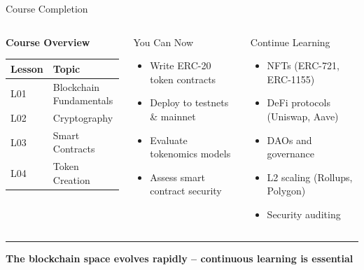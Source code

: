 \documentclass[8pt,aspectratio=169]{beamer}
\newcommand{\bottomnote}[1]{\vfill\vspace{-2mm}\textcolor{mllavender2}{\rule{\textwidth}{0.4pt}}\vspace{1mm}\footnotesize\textbf{#1}}
\begin{document}
\begin{frame}{Course Completion}
  \begin{columns}[T]
      \begin{center}
      {\small\bfseries Course Overview}\\[4pt]
      \begin{tabular}{@{}ll@{}}
        \toprule
        \textbf{Lesson} & \textbf{Topic} \\
        \midrule
        L01 & Blockchain Fundamentals \\
        L02 & Cryptography \\
        L03 & Smart Contracts \\
        L04 & Token Creation \\
        \bottomrule
      \end{tabular}
      \end{center}

      \begin{block}{You Can Now}
        \begin{itemize}\setlength\itemsep{1pt}
          \scriptsize
          \item[\textcolor{mlgreen}{\checkmark}] Write ERC-20 token contracts
          \item[\textcolor{mlgreen}{\checkmark}] Deploy to testnets \& mainnet
          \item[\textcolor{mlgreen}{\checkmark}] Evaluate tokenomics models
          \item[\textcolor{mlgreen}{\checkmark}] Assess smart contract security
        \end{itemize}
      \end{block}
      \begin{block}{Continue Learning}
        \begin{itemize}\setlength\itemsep{1pt}
          \scriptsize
          \item[\(\rightarrow\)] NFTs (ERC-721, ERC-1155)
          \item[\(\rightarrow\)] DeFi protocols (Uniswap, Aave)
          \item[\(\rightarrow\)] DAOs and governance
          \item[\(\rightarrow\)] L2 scaling (Rollups, Polygon)
          \item[\(\rightarrow\)] Security auditing
        \end{itemize}
      \end{block}
  \end{columns}
  \bottomnote{The blockchain space evolves rapidly -- continuous learning is essential}
\end{frame}
\end{document}
